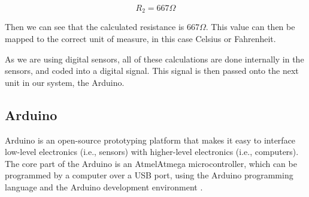 \begin{equation}
R_{2} = 667\Omega
\end{equation} 

Then we can see that the calculated resistance is 667$\Omega$. This value can then be mapped to the correct unit of measure, in this case Celsius or Fahrenheit. 

As we are using digital sensors, all of these calculations are done internally in the sensors, and coded into a digital signal. This signal is then passed onto the next unit in our system, the Arduino.  

\subsection{Arduino}

Arduino is an open-source prototyping platform that makes it easy to interface low-level electronics (i.e., sensors) with higher-level electronics (i.e., computers). The core part of the Arduino is an Atmel\texttrademark Atmega microcontroller, which can be programmed by a computer over a USB port, using the Arduino programming language and the Arduino development environment \citep{Arduino}.


